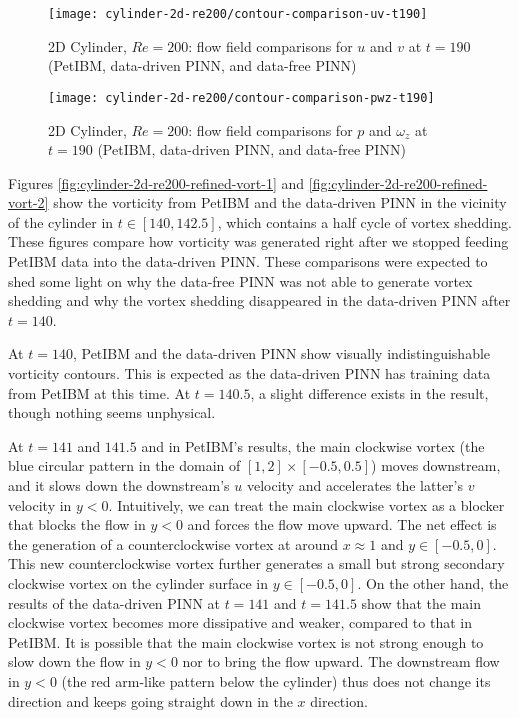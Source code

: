 \begin{figure}[hbt!]
    \texttt{[image: cylinder-2d-re200/contour-comparison-uv-t190]}
    \caption{2D Cylinder, $Re=200$: flow field comparisons for $u$ and $v$ at $t=190$ (PetIBM, data-driven PINN, and data-free PINN)}
    \label{fig:cylinder-re200-contour-uv-t190}
\end{figure}

\begin{figure}[hbt!]
    \texttt{[image: cylinder-2d-re200/contour-comparison-pwz-t190]}
    \caption{2D Cylinder, $Re=200$: flow field comparisons for $p$ and $\omega_z$ at $t=190$ (PetIBM, data-driven PINN, and data-free PINN)}
    \label{fig:cylinder-re200-contour-pwz-t190}
\end{figure}

Figures \ref{fig:cylinder-2d-re200-refined-vort-1} and \ref{fig:cylinder-2d-re200-refined-vort-2} show the vorticity from PetIBM and the data-driven PINN in the vicinity of the cylinder in $t \in [140, 142.5]$, which contains a half cycle of vortex shedding.
These figures compare how vorticity was generated right after we stopped feeding PetIBM data into the data-driven PINN.
These comparisons were expected to shed some light on why the data-free PINN was not able to generate vortex shedding and why the vortex shedding disappeared in the data-driven PINN after $t=140$.

At $t=140$, PetIBM and the data-driven PINN show visually indistinguishable vorticity contours.
This is expected as the data-driven PINN has training data from PetIBM at this time.
At $t=140.5$, a slight difference exists in the result, though nothing seems unphysical.

At $t=141$ and $141.5$ and in PetIBM's results, the main clockwise vortex (the blue circular pattern in the domain of $[1, 2]\times[-0.5, 0.5]$) moves downstream, and it slows down the downstream's $u$ velocity and accelerates the latter's $v$ velocity in $y<0$.
Intuitively, we can treat the main clockwise vortex as a blocker that blocks the flow in $y<0$ and forces the flow move upward.
The net effect is the generation of a counterclockwise vortex at around $x\approx 1$ and $y \in [-0.5, 0]$.
This new counterclockwise vortex further generates a small but strong secondary clockwise vortex on the cylinder surface in $y\in[-0.5, 0]$.
On the other hand, the results of the data-driven PINN at $t=141$ and $t=141.5$ show that the main clockwise vortex becomes more dissipative and weaker, compared to that in PetIBM.
It is possible that the main clockwise vortex is not strong enough to slow down the flow in $y<0$ nor to bring the flow upward.
The downstream flow in $y<0$ (the red arm-like pattern below the cylinder) thus does not change its direction and keeps going straight down in the $x$ direction.


